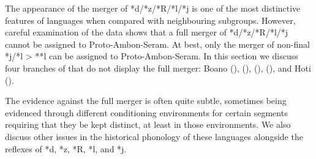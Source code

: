 The appearance of the merger of *d/*z/*R/*l/*j is one of the
most distinctive features of  languages when
compared with neighbouring subgroups.
However, careful examination of the data shows that a full merger
of *d/*z/*R/*l/*j cannot be assigned to Proto-Ambon-Seram.
At best, only the merger of non-final *j/*l > **l can be assigned to Proto-Ambon-Seram.
In this section we discuss four branches of 
that do not display the full merger: Boano (),
 (),  (),
 (), and Hoti ().

The evidence against the full merger is often quite subtle,
sometimes being evidenced through different conditioning environments for certain
segments requiring that they be kept distinct,
at least in those environments.
We also discuss other issues in the historical phonology of these
languages alongside the reflexes of *d,
*z, *R, *l, and *j.